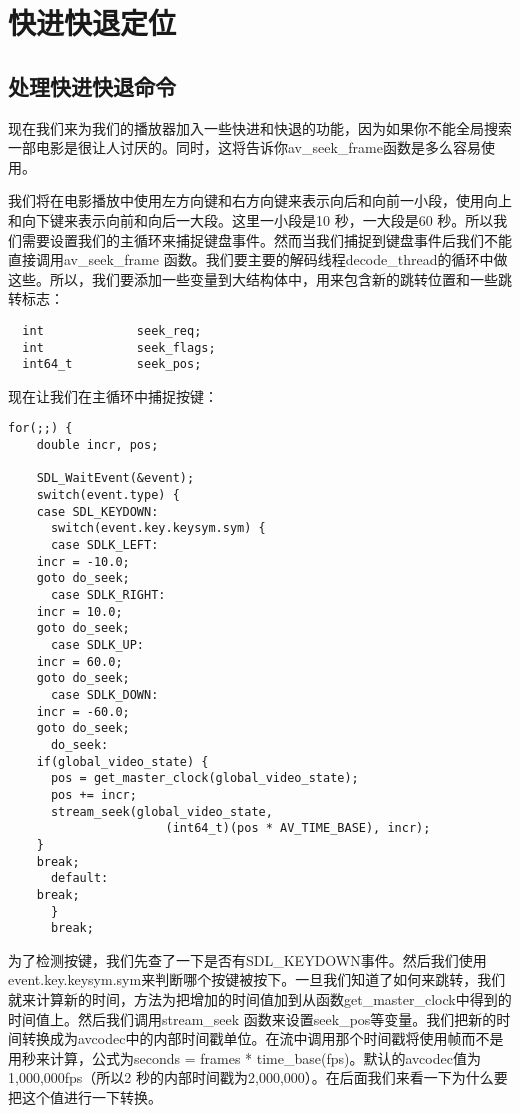 ﻿\chapter{快进快退定位}
\label{ch7}
\section{处理快进快退命令}
现在我们来为我们的播放器加入一些快进和快退的功能，因为如果你不能全局搜索一部电影是很让人讨厌的。同时，这将告诉你av_seek_frame函数是多么容易使用。

我们将在电影播放中使用左方向键和右方向键来表示向后和向前一小段，使用向上和向下键来表示向前和向后一大段。这里一小段是10 秒，一大段是60 秒。所以我们需要设置我们的主循环来捕捉键盘事件。然而当我们捕捉到键盘事件后我们不能直接调用av_seek_frame 函数。我们要主要的解码线程decode_thread的循环中做这些。所以，我们要添加一些变量到大结构体中，用来包含新的跳转位置和一些跳转标志：
\begin{lstlisting}
  int             seek_req;
  int             seek_flags;
  int64_t         seek_pos;
\end{lstlisting}

现在让我们在主循环中捕捉按键：

\begin{lstlisting}
for(;;) {
    double incr, pos;

    SDL_WaitEvent(&event);
    switch(event.type) {
    case SDL_KEYDOWN:
      switch(event.key.keysym.sym) {
      case SDLK_LEFT:
    incr = -10.0;
    goto do_seek;
      case SDLK_RIGHT:
    incr = 10.0;
    goto do_seek;
      case SDLK_UP:
    incr = 60.0;
    goto do_seek;
      case SDLK_DOWN:
    incr = -60.0;
    goto do_seek;
      do_seek:
    if(global_video_state) {
      pos = get_master_clock(global_video_state);
      pos += incr;
      stream_seek(global_video_state,
                      (int64_t)(pos * AV_TIME_BASE), incr);
    }
    break;
      default:
    break;
      }
      break;
\end{lstlisting}

为了检测按键，我们先查了一下是否有SDL_KEYDOWN事件。然后我们使用event.key.keysym.sym来判断哪个按键被按下。一旦我们知道了如何来跳转，我们就来计算新的时间，方法为把增加的时间值加到从函数get_master_clock中得到的时间值上。然后我们调用stream_seek 函数来设置seek_pos等变量。我们把新的时间转换成为avcodec中的内部时间戳单位。在流中调用那个时间戳将使用帧而不是用秒来计算，公式为seconds = frames * time_base(fps)。默认的avcodec值为1,000,000fps（所以2 秒的内部时间戳为2,000,000）。在后面我们来看一下为什么要把这个值进行一下转换。


